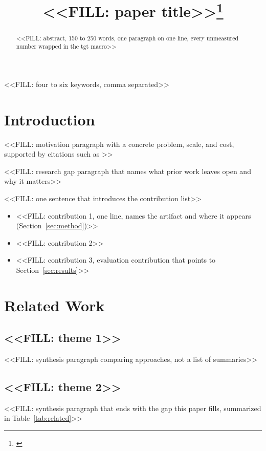 \documentclass[conference]{IEEEtran}
\title{<<FILL: paper title>>\thanks{\textcolor{tgtblue}{\tgtnotice}}}
\author{\IEEEauthorblockN{Anonymous Author(s)}
\IEEEauthorblockA{Affiliation withheld for double-anonymous review}}
\begin{document}
\maketitle

\begin{abstract}
<<FILL: abstract, 150 to 250 words, one paragraph on one line, every unmeasured number wrapped in the tgt macro>>
\end{abstract}

\begin{IEEEkeywords}
<<FILL: four to six keywords, comma separated>>
\end{IEEEkeywords}

\section{Introduction}\label{sec:intro}
<<FILL: motivation paragraph with a concrete problem, scale, and cost, supported by citations such as \cite{he2016deep}>>

<<FILL: research gap paragraph that names what prior work leaves open and why it matters>>

<<FILL: one sentence that introduces the contribution list>>
\begin{itemize}
\item <<FILL: contribution 1, one line, names the artifact and where it appears (Section~\ref{sec:method})>>
\item <<FILL: contribution 2>>
\item <<FILL: contribution 3, evaluation contribution that points to Section~\ref{sec:results}>>
\end{itemize}

\section{Related Work}\label{sec:related}
\subsection{<<FILL: theme 1>>}
<<FILL: synthesis paragraph comparing approaches, not a list of summaries>>

\subsection{<<FILL: theme 2>>}
<<FILL: synthesis paragraph that ends with the gap this paper fills, summarized in Table~\ref{tab:related}>>
\end{document}
